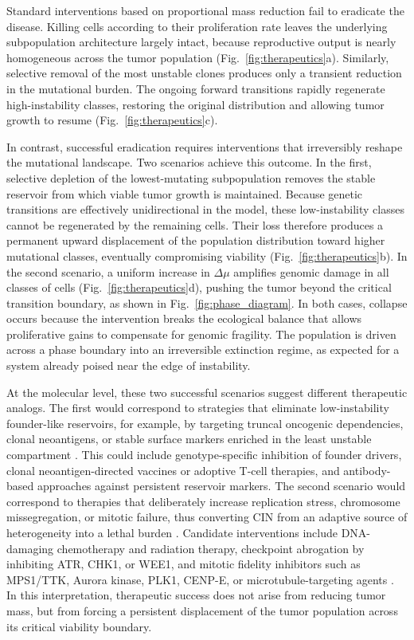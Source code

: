 \documentclass[10pt, aps, rmp,  twocolumn, superscriptaddress, floatfix, showkeys]{revtex4-2}
\begin{document}
Standard interventions based on proportional mass reduction fail to eradicate the disease. Killing cells according to their proliferation rate leaves the underlying subpopulation architecture largely intact, because reproductive output is nearly homogeneous across the tumor population (Fig.~\ref{fig:therapeutics}a). Similarly, selective removal of the most unstable clones produces only a transient reduction in the mutational burden. The ongoing forward transitions rapidly regenerate high-instability classes, restoring the original distribution and allowing tumor growth to resume (Fig.~\ref{fig:therapeutics}c).

In contrast, successful eradication requires interventions that irreversibly reshape the mutational landscape. Two scenarios achieve this outcome. In the first, selective depletion of the lowest-mutating subpopulation removes the stable reservoir from which viable tumor growth is maintained. Because genetic transitions are effectively unidirectional in the model, these low-instability classes cannot be regenerated by the remaining cells. Their loss therefore produces a permanent upward displacement of the population distribution toward higher mutational classes, eventually compromising viability (Fig.~\ref{fig:therapeutics}b). In the second scenario, a uniform increase in $\Delta\mu$ amplifies genomic damage in all classes of cells (Fig.~\ref{fig:therapeutics}d), pushing the tumor beyond the critical transition boundary, as shown in Fig.~\ref{fig:phase_diagram}. In both cases, collapse occurs because the intervention breaks the ecological balance that allows proliferative gains to compensate for genomic fragility. The population is driven across a phase boundary into an irreversible extinction regime, as expected for a system already poised near the edge of instability.

At the molecular level, these two successful scenarios 
suggest different therapeutic analogs. The first would 
correspond to strategies that eliminate low-instability 
founder-like reservoirs, for example, by targeting truncal 
oncogenic dependencies, clonal neoantigens, or stable surface 
markers enriched in the least unstable compartment 
\cite{Weinstein2002,Gerlinger2012,McGranahan2016}. This could 
include genotype-specific inhibition of founder drivers, 
clonal neoantigen-directed vaccines or adoptive T-cell therapies, 
and antibody-based approaches against persistent 
reservoir markers. The second scenario would correspond 
to therapies that deliberately increase replication stress, 
chromosome missegregation, or mitotic failure, thus converting 
CIN from an adaptive source of heterogeneity into a 
lethal burden \cite{Sansregret2018,Hosea2024}. Candidate 
interventions include DNA-damaging chemotherapy and 
radiation therapy, checkpoint abrogation by inhibiting 
ATR, CHK1, or WEE1, and mitotic fidelity inhibitors such 
as MPS1/TTK, Aurora kinase, PLK1, CENP-E, or microtubule-targeting 
agents \cite{Bakhoum2015,daCosta2023,Longo2024}. In 
this interpretation, therapeutic success does not arise from 
reducing tumor mass, but from forcing a persistent 
displacement of the tumor population across its critical 
viability boundary.
\end{document}
